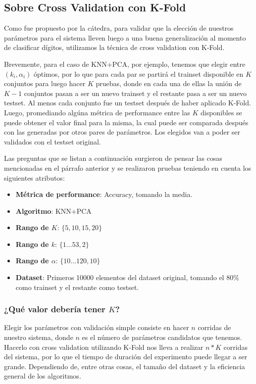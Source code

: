 \subsection{Sobre Cross Validation con K-Fold}

Como fue propuesto por la cátedra, para validar que la elección de nuestros parámetros para el sistema lleven luego a una buena generalización al momento de clasificar dígitos, utilizamos la técnica de cross validation con K-Fold.

Brevemente, para el caso de KNN+PCA, por ejemplo, tenemos que elegir entre $(k_i, \alpha_i)$ óptimos, por lo que para cada par se partirá el trainset disponible en $K$ conjuntos para luego hacer $K$ pruebas, donde en cada una de ellas la unión de $K-1$ conjuntos pasan a ser un nuevo trainset y el restante pasa a ser un nuevo testset. Al menos cada conjunto fue un testset después de haber aplicado K-Fold. Luego, promediando algúna métrica de performance entre las $K$ disponibles se puede obtener el valor final para la misma, la cual puede ser comparada después con las generadas por otros pares de parámetros. Los elegidos van a poder ser validados con el testset original.

Las preguntas que se listan a continuación surgieron de pensar las cosas mencionadas en el párrafo anterior y se realizaron pruebas teniendo en cuenta los siguientes atributos:

\begin{itemize}
    \item \textbf{Métrica de performance}: Accuracy, tomando la media.
    \item \textbf{Algoritmo}: KNN+PCA
    \item \textbf{Rango de $K$}: $\{5, 10, 15, 20\}$
    \item \textbf{Rango de $k$}: $\{1\dots53, 2\}$
    \item \textbf{Rango de $\alpha$}: $\{10\dots120, 10\}$
    \item \textbf{Dataset}: Primeros 10000 elementos del dataset original, tomando el $80\%$ como trainset y el restante como testset.
\end{itemize}

\subsubsection{¿Qué valor debería tener $K$?}\label{KFoldValueK}

Elegir los parámetros con validación simple consiste en hacer $n$ corridas de nuestro sistema, donde $n$ es el número de parámetros candidatos que tenemos. Hacerlo con cross validation utilizando K-Fold nos lleva a realizar $n * K$ corridas del sistema, por lo que el tiempo de duración del experimento puede llegar a ser grande. Dependiendo de, entre otras cosas, el tamaño del dataset y la eficiencia general de los algoritmos.

